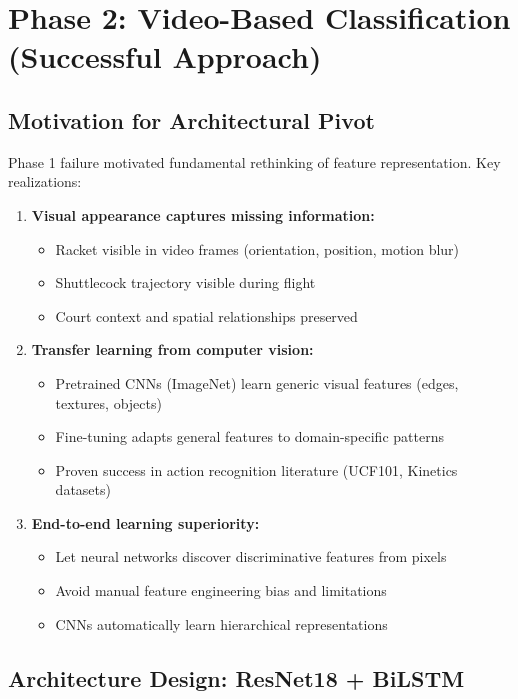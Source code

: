 \documentclass[11pt,a4paper]{article}
\begin{document}
\section{Phase 2: Video-Based Classification (Successful Approach)}

\subsection{Motivation for Architectural Pivot}

Phase 1 failure motivated fundamental rethinking of feature representation. Key realizations:

\begin{enumerate}
\item \textbf{Visual appearance captures missing information:}
   \begin{itemize}
   \item Racket visible in video frames (orientation, position, motion blur)
   \item Shuttlecock trajectory visible during flight
   \item Court context and spatial relationships preserved
   \end{itemize}

\item \textbf{Transfer learning from computer vision:}
   \begin{itemize}
   \item Pretrained CNNs (ImageNet) learn generic visual features (edges, textures, objects)
   \item Fine-tuning adapts general features to domain-specific patterns
   \item Proven success in action recognition literature (UCF101, Kinetics datasets)
   \end{itemize}

\item \textbf{End-to-end learning superiority:}
   \begin{itemize}
   \item Let neural networks discover discriminative features from pixels
   \item Avoid manual feature engineering bias and limitations
   \item CNNs automatically learn hierarchical representations
   \end{itemize}
\end{enumerate}

\subsection{Architecture Design: ResNet18 + BiLSTM}
\end{document}
